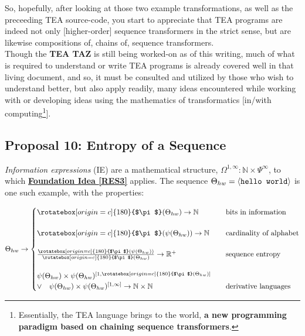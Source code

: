 \documentclass[a4paper, 18pt]{book} %
\newcommand{\invpi}{\rotatebox[origin=c]{180}{$\pi$}}
\begin{document}
\begin{appendices}
 So, hopefully, after looking at those two example transformations, as well as the preceeding TEA source-code, you start to appreciate that TEA programs are indeed not only [higher-order] sequence transformers in the strict sense, but are likewise compositions of, chains of, sequence transformers.\\
 
 Though the \textbf{TEA TAZ}\cite{Lutalo2024TEATAZ} is still being worked-on as of this writing, much of what is required to understand or write TEA programs is already covered well in that living document, and so, it must be consulted and utilized by those who wish to understand better, but also apply readily, many ideas encountered while working with or developing ideas using the mathematics of transformatics [in/with computing\footnote{Essentially, the TEA language brings to the world, \textbf{a new programming paradigm based on chaining sequence transformers}.}].


\subsection{Proposal 10: Entropy of a Sequence\cite{lnspaper}}
\label{PROPTOE}

\textit{Information expressions} (IE)\cite{lnspaper} are a mathematical structure, $\Omega^{1,\infty} : \mathbb{N} \times \Psi^\infty$, to which \textbf{\hyperref[RES3]{Foundation Idea \ref{RES3}}} applies. The sequence $\Theta_{hw} = \langle \text{\texttt{hello world}} \rangle$ is one such example, with the properties:

\vspace{1em}
\begin{equation}
\label{EQPROP10b}
\Theta_{hw} \rightarrow \begin{cases}
\invpi(\Theta_{hw}) \rightarrow \mathbb{N} & \text{bits in information}\\\\
\invpi(\psi(\Theta_{hw})) \rightarrow \mathbb{N} & \text{cardinality of alphabet}\\\\
\frac{\invpi(\psi(\Theta_{hw}))}{\invpi(\Theta_{hw})} \rightarrow \mathbb{R^+} & \text{sequence entropy}\\\\
\psi(\Theta_{hw}) \times \psi(\Theta_{hw})^{[1,\invpi(\Theta_{hw})]} \quad\\ \lor \quad \psi(\Theta_{hw}) \times \psi(\Theta_{hw})^{[1,\infty]} \rightarrow \mathbb{N} \times \mathbb{N} & \text{derivative languages}\\
\end{cases}
\end{equation}
\vspace{1em}



\end{appendices}
\end{document}

